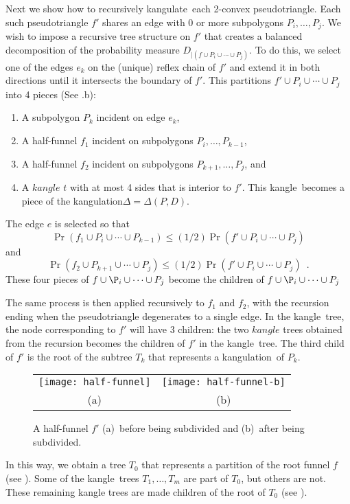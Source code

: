 \documentclass[charterfonts,lotsofwhite]{patmorin}
\newcommand{\kangle}{kangle}
\newcommand{\kangulation}{kangulation}
\newcommand{\kangulate}{kangulate}
\begin{document}
Next we show how to recursively \kangulate\ each 2-convex
pseudotriangle.
Each such pseudotriangle $f'$ shares
an edge with 0 or more subpolygons $P_i,\ldots,P_j$.  We wish to
impose a recursive tree structure on $f'$ that creates a balanced
decomposition of the probability measure $D_{\mid (f\cup
P_i\cup\cdots\cup P_j)}$.   To do this, we select one of the edges
$e_k$ on the (unique) reflex chain of $f'$ and extend it in both directions
until it intersects the boundary of $f'$.  This partitions $f'\cup
P_i\cup\cdots\cup P_j$ into 4 pieces (See .b):
\begin{enumerate}
\item A subpolygon $P_k$ incident on edge $e_k$,
\item A half-funnel $f_1$ incident on subpolygons $P_i,\ldots,P_{k-1}$,
\item A half-funnel $f_2$ incident on subpolygons
$P_{k+1},\ldots,P_j$, and 
\item A $\kangle$ $t$ with at most 4 sides that is interior to $f'$.
This \kangle\ becomes a piece of the \kangulation $\Delta=\Delta(P,D)$.
\end{enumerate}
The edge $e$ is selected so that
\[
   \Pr(f_1\cup P_i\cup\cdots\cup P_{k-1}) 
      \le (1/2)\Pr(f'\cup P_i\cup\cdots\cup P_j)
\]
and
\[
   \Pr(f_2\cup P_{k+1}\cup\cdots\cup P_{j}) 
      \le (1/2)\Pr(f'\cup P_i\cup\cdots\cup P_j) \enspace .
\]
These four pieces of $f\cup\P_i\cup\cdots\cup P_j$ become the children
of $f\cup\P_i\cup\cdots\cup P_j$

The same process is then applied recursively to $f_1$ and $f_2$, with
the recursion ending when the pseudotriangle degenerates to a single edge.
In the \kangle\ tree, the node corresponding to $f'$ will have 3 children:  
the two $\kangle$ trees obtained from the recursion becomes the children
of $f'$ in the \kangle\ tree.  The third child of $f'$ is the root of
the subtree $T_k$ that represents a \kangulation\ of $P_k$.
\begin{figure}
  \begin{center}
    \begin{tabular}{cc}
      \texttt{[image: half-funnel]} & \texttt{[image: half-funnel-b]} \\
      (a) & (b)
    \end{tabular}
  \end{center}
  \caption{A half-funnel $f'$ (a)~before being subdivided and (b)~after
being subdivided.}
\end{figure}
In this way, we obtain a tree $T_0$ that represents a partition of the
root funnel $f$ (see ).  Some of the \kangle\ trees
$T_1,\ldots,T_m$ are part of $T_0$, but others are not.  These
remaining kangle trees are made children of the root of $T_0$ (see
).
\end{document}
